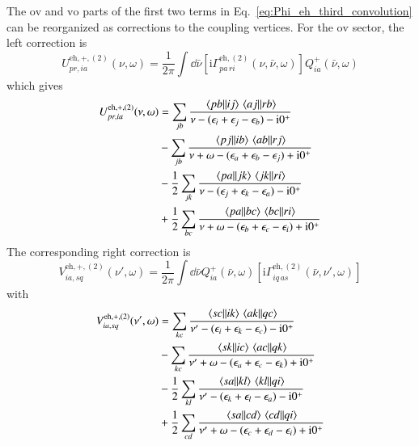 \documentclass[aip,jcp,reprint,noshowkeys,superscriptaddress]{revtex4-1}
\newcommand{\eps}{\epsilon}
\newcommand{\ii}{\mathrm{i}}
\newcommand{\eh}{\text{eh}}
\begin{document}
The $\text{ov}$ and $\text{vo}$ parts of the first two terms in
Eq.~\eqref{eq:Phi_eh_third_convolution} can be reorganized as corrections to
the coupling vertices.
For the $\text{ov}$ sector, the left correction is
\begin{equation}
    U^{\eh,+,(2)}_{pr,ia}(\nu,\omega)
    =
    \frac{1}{2\pi}
    \int\dd{\bar\nu}
    \left[
    \ii\Gamma^{\eh,(2)}_{pa\,ri}(\nu,\bar\nu,\omega)
    \right]
    Q^+_{ia}(\bar\nu,\omega)
    \label{eq:U_eh_second_def}
\end{equation}
which gives
\begin{equation}
    \begin{split}
    U^{\eh,+,(2)}_{pr,ia}(\nu,\omega)
    & =
    \sum_{jb}
    \frac{\mel{pb}{}{ij}\mel{aj}{}{rb}}
    {\nu-(\eps_i+\eps_j-\eps_b)-\ii0^+}
    \\
    &-
    \sum_{jb}
    \frac{\mel{pj}{}{ib}\mel{ab}{}{rj}}
    {\nu+\omega-(\eps_a+\eps_b-\eps_j)+\ii0^+}
    \\
    &-
    \frac12
    \sum_{jk}
    \frac{\mel{pa}{}{jk}\mel{jk}{}{ri}}
    {\nu-(\eps_j+\eps_k-\eps_a)-\ii0^+}
    \\
    &+
    \frac12
    \sum_{bc}
    \frac{\mel{pa}{}{bc}\mel{bc}{}{ri}}
    {\nu+\omega-(\eps_b+\eps_c-\eps_i)+\ii0^+}
    \end{split}
    \label{eq:U_eh_second_explicit}
\end{equation}
The corresponding right correction is
\begin{equation}
    V^{\eh,+,(2)}_{ia,sq}(\nu',\omega)
    =
    \frac{1}{2\pi}
    \int\dd{\bar\nu}
    Q^+_{ia}(\bar\nu,\omega)
    \left[
    \ii\Gamma^{\eh,(2)}_{iq\,as}(\bar\nu,\nu',\omega)
    \right]
    \label{eq:V_eh_second_def}
\end{equation}
with
\begin{equation}
    \begin{split}
    V^{\eh,+,(2)}_{ia,sq}(\nu',\omega)
    & =
    \sum_{kc}
    \frac{\mel{sc}{}{ik}\mel{ak}{}{qc}}
    {\nu'-(\eps_i+\eps_k-\eps_c)-\ii0^+}
    \\
    &-
    \sum_{kc}
    \frac{\mel{sk}{}{ic}\mel{ac}{}{qk}}
    {\nu'+\omega-(\eps_a+\eps_c-\eps_k)+\ii0^+}
    \\
    &-
    \frac12
    \sum_{kl}
    \frac{\mel{sa}{}{kl}\mel{kl}{}{qi}}
    {\nu'-(\eps_k+\eps_l-\eps_a)-\ii0^+}
    \\
    &+
    \frac12
    \sum_{cd}
    \frac{\mel{sa}{}{cd}\mel{cd}{}{qi}}
    {\nu'+\omega-(\eps_c+\eps_d-\eps_i)+\ii0^+}
    \end{split}
    \label{eq:V_eh_second_explicit}
\end{equation}
\end{document}
